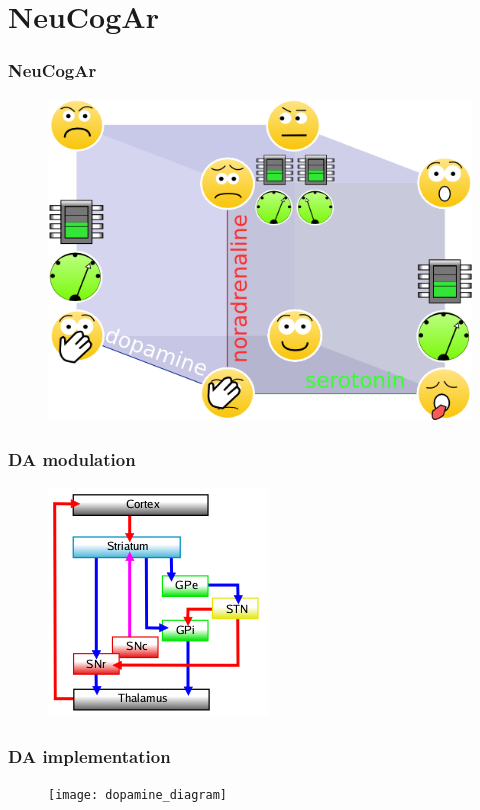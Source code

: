 \documentclass[12pt, aspectratio=169]{beamer}
\begin{document}

\section{NeuCogAr}
\begin{frame}
  \frametitle{NeuCogAr}
  \begin{figure}
    \includegraphics[width=0.5\linewidth]{cube_of_emotional_parameters_machine}
  \end{figure}
\end{frame}
\begin{frame}
\frametitle{DA modulation}
\begin{figure}
\includegraphics[width=0.5\linewidth]{nigrostriatal}
\end{figure}
\end{frame}
\begin{frame}
\frametitle{DA implementation}
\begin{figure}
\texttt{[image: dopamine\_diagram]}
\end{figure}
\end{frame}
\end{document}
